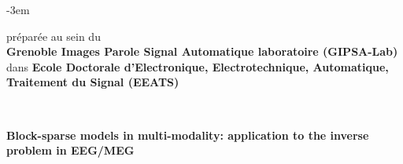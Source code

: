 \begin{titlepage}
\begin{adjustwidth}{}{-3em}
\begin{flushleft}
\vfill

\begin{flushright}
\begin{minipage}{\leftshift}
\begin{flushleft}
{préparée au sein du \\\textbf{Grenoble Images Parole Signal Automatique laboratoire (GIPSA-Lab)}\\
dans \textbf{Ecole Doctorale d'Electronique, Electrotechnique, Automatique, Traitement du Signal (EEATS)}}
\end{flushleft}
\end{minipage}
\end{flushright}~~\\[1cm]

\vfill

\begin{flushright}
\begin{minipage}{\leftshift}
\begin{flushleft}
{ \huge \bfseries Block-sparse models in multi-modality: application to the inverse problem in EEG/MEG}
\end{flushleft}
\end{minipage}
\end{flushright}~~\\[1cm]

\vfill


\end{flushleft}
\end{adjustwidth}
\end{titlepage}
